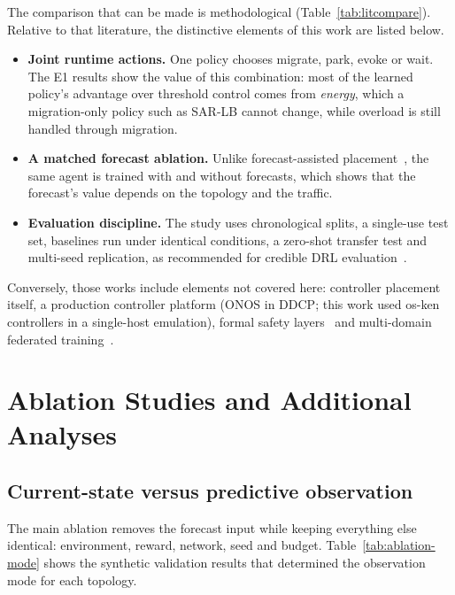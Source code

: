 The comparison that can be made is methodological (Table~\ref{tab:litcompare}). Relative to that literature, the distinctive elements of this work are listed below.
\begin{itemize}[leftmargin=*]
  \item \textbf{Joint runtime actions.} One policy chooses migrate, park, evoke or wait. The E1 results show the value of this combination: most of the learned policy's advantage over threshold control comes from \emph{energy}, which a migration-only policy such as SAR-LB cannot change, while overload is still handled through migration.
  \item \textbf{A matched forecast ablation.} Unlike forecast-assisted placement~\cite{li2024mec}, the same agent is trained with and without forecasts, which shows that the forecast's value depends on the topology and the traffic.
  \item \textbf{Evaluation discipline.} The study uses chronological splits, a single-use test set, baselines run under identical conditions, a zero-shot transfer test and multi-seed replication, as recommended for credible DRL evaluation~\cite{henderson2018matters,agarwal2021precipice}.
\end{itemize}
Conversely, those works include elements not covered here: controller placement itself, a production controller platform (ONOS in DDCP; this work used os-ken controllers in a single-host emulation), formal safety layers~\cite{dinh2025safe} and multi-domain federated training~\cite{jha2026federated}.

\section{Ablation Studies and Additional Analyses}
\label{sec:ablation}

\subsection{Current-state versus predictive observation}
\label{sec:ablation-mode}

The main ablation removes the forecast input while keeping everything else identical: environment, reward, network, seed and budget. Table~\ref{tab:ablation-mode} shows the synthetic validation results that determined the observation mode for each topology.

